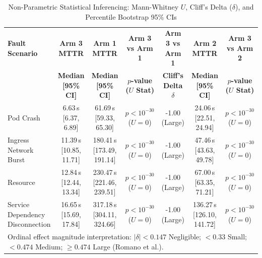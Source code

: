 \begin{table}[t]
\caption{Non-Parametric Statistical Inferencing: Mann-Whitney $U$, Cliff's Delta ($\delta$), and Percentile Bootstrap 95\% CIs}
\label{tab:statistical_inference}
\centering
\small
\setlength{\tabcolsep}{4.5pt}
\renewcommand{\arraystretch}{1.2}
\begin{tabular}{lcccccc}
\hline
\textbf{Fault Scenario} & \textbf{Arm 3 MTTR} & \textbf{Arm 1 MTTR} & \textbf{Arm 3 vs Arm 1} & \textbf{Arm 3 vs Arm 1} & \textbf{Arm 2 MTTR} & \textbf{Arm 3 vs Arm 2} \\
 & \textbf{Median [95\% CI]} & \textbf{Median [95\% CI]} & \textbf{$p$-value ($U$ Stat)} & \textbf{Cliff's Delta $\delta$} & \textbf{Median [95\% CI]} & \textbf{$p$-value ($U$ Stat)} \\
\hline
Pod Crash & 6.63\,s [6.37, 6.89] & 61.69\,s [59.33, 65.30] & $p < 10^{-30}$ ($U=0$) & -1.00 (Large) & 24.06\,s [22.51, 24.94] & $p < 10^{-30}$ ($U=0$) \\
Ingress Network Burst & 11.39\,s [10.85, 11.71] & 180.41\,s [173.49, 191.14] & $p < 10^{-30}$ ($U=0$) & -1.00 (Large) & 47.46\,s [43.63, 49.78] & $p < 10^{-30}$ ($U=0$) \\
Resource & 12.84\,s [12.44, 13.34] & 230.47\,s [221.46, 239.51] & $p < 10^{-30}$ ($U=0$) & -1.00 (Large) & 67.00\,s [63.35, 71.21] & $p < 10^{-30}$ ($U=0$) \\
Service Dependency Disconnection & 16.65\,s [15.69, 17.84] & 317.18\,s [304.11, 324.66] & $p < 10^{-30}$ ($U=0$) & -1.00 (Large) & 136.27\,s [126.10, 141.72] & $p < 10^{-30}$ ($U=0$) \\
\hline
\multicolumn{7}{l}{\footnotesize Ordinal effect magnitude interpretation: $|\delta| < 0.147$ Negligible; $< 0.33$ Small; $< 0.474$ Medium; $\ge 0.474$ Large (Romano et al.).}
\end{tabular}
\end{table}